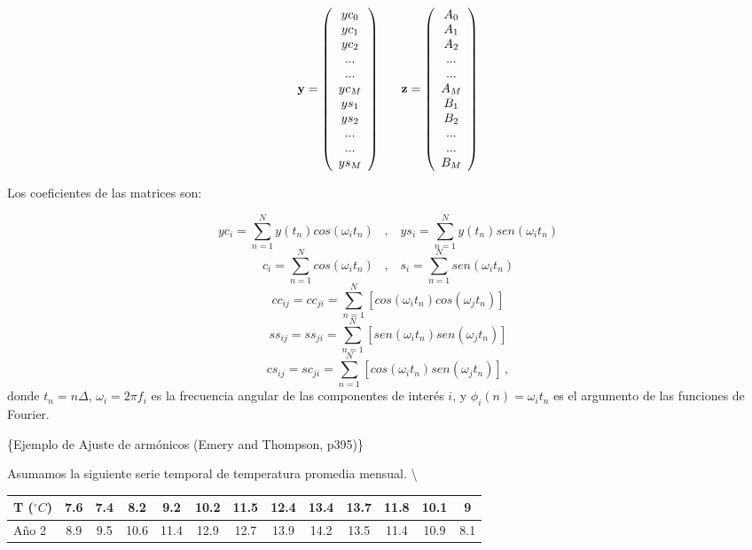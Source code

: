 \documentclass[
]{agujournal2019}
\begin{document}
\[{\textbf y}=\left( \begin{array}{ccc}
yc_0 \\
yc_1 \\
yc_2 \\
... \\
... \\
yc_M \\
ys_1 \\
ys_2 \\
... \\
... \\
ys_M \\
\end{array} \right)\,\,\,\,\,\,\,\,\,\,
{\textbf z}=\left( \begin{array}{ccc}
A_0\\
A_1\\
A_2\\
...\\
...\\
A_M\\
B_1\\
B_2\\
...\\
...\\
B_M
\end{array} \right)\]

Los coeficientes de las matrices son:

\[yc_i=\sum\limits^N_{n=1}y(t_n)cos(\omega_i t_n)\,\,\,\,\,,\,\,\,\,\,ys_i=\sum\limits^N_{n=1}y(t_n)sen(\omega_i t_n)\]
\[c_i=\sum\limits^N_{n=1}cos(\omega_i t_n)\,\,\,\,\,,\,\,\,\,\,s_i=\sum\limits^N_{n=1}sen(\omega_i t_n)\]
\[cc_{ij}=cc_{ji}=\sum\limits^N_{n=1}[cos(\omega_i t_n)cos(\omega_j t_n)]\]
\[ss_{ij}=ss_{ji}=\sum\limits^N_{n=1}[sen(\omega_i t_n)sen(\omega_j t_n)]\]
\[cs_{ij}=sc_{ji}=\sum\limits^N_{n=1}[cos(\omega_i t_n)sen(\omega_j t_n)]\,,\]
donde \(t_n= n \Delta\), \(\omega_i = 2\pi f_i\) es la frecuencia
angular de las componentes de interés \(i\), y
\(\phi_i(n)=\omega_i t_n\) es el argumento de las funciones de Fourier.

\vspace{0.25cm}

\{\textbf \noindent Ejemplo de Ajuste de armónicos (Emery and Thompson,
p395)\}

Asumamos la siguiente serie temporal de temperatura promedia mensual.
\textbackslash{}

\begin{tabular}{|l|cccccccccccc|}
\hline
T ($^\circ C$) & 7.6 & 7.4 & 8.2 & 9.2 & 10.2 & 11.5 & 12.4 & 13.4 & 13.7 & 11.8 & 10.1 & 9\\
\hline
Año 2 & 8.9 & 9.5 & 10.6 & 11.4 & 12.9 & 12.7 & 13.9 & 14.2 & 13.5 & 11.4 & 10.9 & 8.1\\
\hline
\end{tabular}
\end{document}
